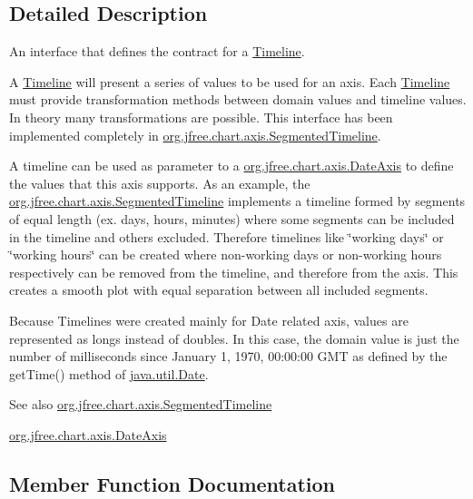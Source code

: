 \subsection{Detailed Description}
An interface that defines the contract for a \mbox{\hyperlink{interfaceorg_1_1jfree_1_1chart_1_1axis_1_1_timeline}{Timeline}}. 

A \mbox{\hyperlink{interfaceorg_1_1jfree_1_1chart_1_1axis_1_1_timeline}{Timeline}} will present a series of values to be used for an axis. Each \mbox{\hyperlink{interfaceorg_1_1jfree_1_1chart_1_1axis_1_1_timeline}{Timeline}} must provide transformation methods between domain values and timeline values. In theory many transformations are possible. This interface has been implemented completely in \mbox{\hyperlink{classorg_1_1jfree_1_1chart_1_1axis_1_1_segmented_timeline}{org.\+jfree.\+chart.\+axis.\+Segmented\+Timeline}}. 

A timeline can be used as parameter to a \mbox{\hyperlink{classorg_1_1jfree_1_1chart_1_1axis_1_1_date_axis}{org.\+jfree.\+chart.\+axis.\+Date\+Axis}} to define the values that this axis supports. As an example, the \mbox{\hyperlink{classorg_1_1jfree_1_1chart_1_1axis_1_1_segmented_timeline}{org.\+jfree.\+chart.\+axis.\+Segmented\+Timeline}} implements a timeline formed by segments of equal length (ex. days, hours, minutes) where some segments can be included in the timeline and others excluded. Therefore timelines like \char`\"{}working days\char`\"{} or \char`\"{}working hours\char`\"{} can be created where non-\/working days or non-\/working hours respectively can be removed from the timeline, and therefore from the axis. This creates a smooth plot with equal separation between all included segments. 

Because Timelines were created mainly for Date related axis, values are represented as longs instead of doubles. In this case, the domain value is just the number of milliseconds since January 1, 1970, 00\+:00\+:00 G\+MT as defined by the get\+Time() method of \mbox{\hyperlink{}{java.\+util.\+Date}}.

\begin{DoxySeeAlso}{See also}
\mbox{\hyperlink{classorg_1_1jfree_1_1chart_1_1axis_1_1_segmented_timeline}{org.\+jfree.\+chart.\+axis.\+Segmented\+Timeline}} 

\mbox{\hyperlink{classorg_1_1jfree_1_1chart_1_1axis_1_1_date_axis}{org.\+jfree.\+chart.\+axis.\+Date\+Axis}} 
\end{DoxySeeAlso}


\subsection{Member Function Documentation}
\mbox{\label{interfaceorg_1_1jfree_1_1chart_1_1axis_1_1_timeline_a36e80eb3f224df36ab4c3597ef17928f}} 
